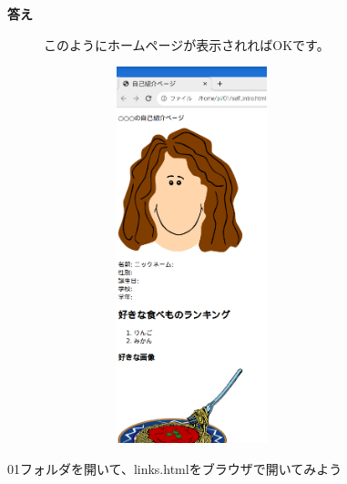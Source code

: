 \documentclass[a4paper,12pt]{jarticle}
\begin{document}
\bigskip

\clearpage
\textbf{答え}



\begin{figure}[hb]
  \centering
  \begin{minipage}{16.574cm}
    このようにホームページが表示されればOKです。

    \centering
    \includegraphics[width=8.588cm,height=10.933cm]{textbook-img142.png}
  \end{minipage}

\end{figure}
\theQuestion\label{Q:hasAnswer04-1}

01フォルダを開いて、links.htmlをブラウザで開いてみよう


\bigskip

\vfill
\end{document}
